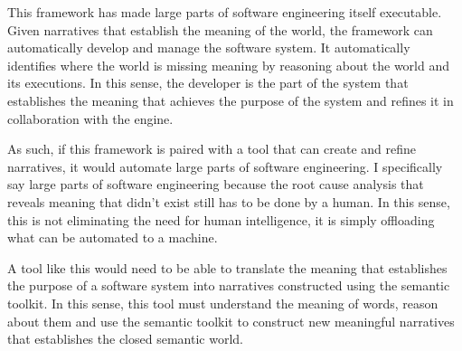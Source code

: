 This framework has made large parts of software engineering itself executable. Given narratives that establish the meaning of the world, the framework can automatically develop and manage the software system. It automatically identifies where the world is missing meaning by reasoning about the world and its executions. In this sense, the developer is the part of the system that establishes the meaning that achieves the purpose of the system and refines it in collaboration with the engine.

As such, if this framework is paired with a tool that can create and refine narratives, it would automate large parts of software engineering. I specifically say large parts of software engineering because the root cause analysis that reveals meaning that didn't exist still has to be done by a human. In this sense, this is not eliminating the need for human intelligence, it is simply offloading what can be automated to a machine. 

A tool like this would need to be able to translate the meaning that establishes the purpose of a software system into narratives constructed using the semantic toolkit. In this sense, this tool must understand the meaning of words, reason about them and use the semantic toolkit to construct new meaningful narratives that establishes the closed semantic world.
